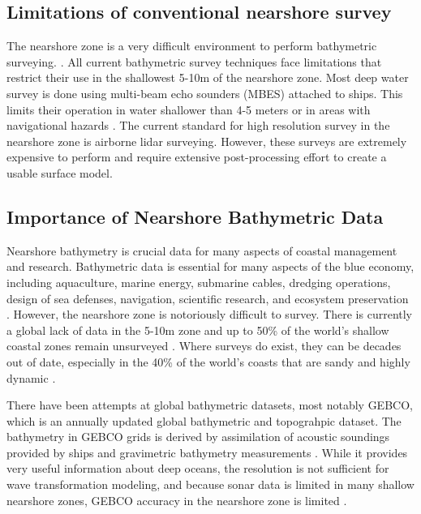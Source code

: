 \subsection{Limitations of conventional nearshore survey}

The nearshore zone is a very difficult environment to perform bathymetric surveying. \parencite{Parrish2019}. All current bathymetric survey techniques face limitations that restrict their use in the shallowest 5-10m of the nearshore zone. Most deep water survey is done using multi-beam echo sounders (MBES) attached to ships. This limits their operation in water shallower than 4-5 meters or in areas with navigational hazards \parencite{Cesbron2021,Montys2015}. The current standard for high resolution survey in the nearshore zone is airborne lidar surveying. However, these surveys are extremely expensive to perform and require extensive post-processing effort to create a usable surface model.


\subsection{Importance of Nearshore Bathymetric Data}

Nearshore bathymetry is crucial data for many aspects of coastal management and research. Bathymetric data is essential for many aspects of the blue economy, including aquaculture, marine energy, submarine cables, dredging operations, design of sea defenses, navigation, scientific research, and ecosystem preservation \parencite{Cesbron2021,Ashphaq2021}. However, the nearshore zone is notoriously difficult to survey. There is currently a global lack of data in the 5-10m zone \parencite{Albright2021} and up to 50\% of the world's shallow coastal zones remain unsurveyed \parencite{IHO/OHI2022}. Where surveys do exist, they can be decades out of date, especially in the 40\% of the world's coasts that are sandy and highly dynamic \parencite{Almar2021e}.

There have been attempts at global bathymetric datasets, most notably GEBCO, which is an annually updated global bathymetric and topograhpic dataset. The bathymetry in GEBCO grids is derived by assimilation of acoustic soundings provided by ships and gravimetric bathymetry measurements \parencite{Cesbron2021}. While it provides very useful information about deep oceans, the resolution is not sufficient for wave transformation modeling, and because sonar data is limited in many shallow nearshore zones, GEBCO accuracy in the nearshore zone is limited \parencite{Monteys2015}.

